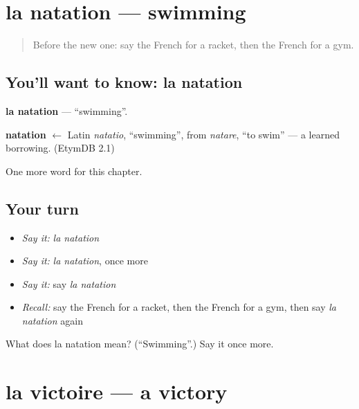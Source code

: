 \section[la natation]{la natation — swimming}

\label{lesson:FR-C173-natation}



\begin{quote}
Before the new one: say the French for a racket, then the French for a gym.
\end{quote}

\subsection*{You'll want to know: la natation}
\textbf{la natation} — \textquotedblleft{}swimming\textquotedblright{}.

\begin{cousinweb}
\textbf{natation} $\leftarrow$ Latin \emph{natatio}, \textquotedblleft{}swimming\textquotedblright{}, from \emph{natare}, \textquotedblleft{}to swim\textquotedblright{} — a learned borrowing. (EtymDB 2.1)
\end{cousinweb}

\begin{grammarlens}[title={What you've built}]
One more word for this chapter.
\end{grammarlens}

\subsection*{Your turn}
\begin{itemize}
\raggedright
  \item \emph{Say it:} \emph{la natation}
  \item \emph{Say it:} \emph{la natation}, once more
  \item \emph{Say it:} say \emph{la natation}
  \item \emph{Recall:} say the French for a racket, then the French for a gym, then say \emph{la natation} again
\end{itemize}

\begin{tcolorbox}[breakable,colback=teal!4,colframe=teal!35!black,title={Before you move on}]
What does la natation mean? (\textquotedblleft{}Swimming\textquotedblright{}.) Say it once more.
\end{tcolorbox}
\section[la victoire]{la victoire — a victory}

